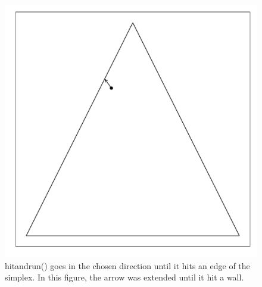 \documentclass{article}\usepackage{graphicx, color}
\makeatletter
\def\maxwidth{ %
  \ifdim\Gin@nat@width>\linewidth
    \linewidth
  \else
    \Gin@nat@width
  \fi
}
\newenvironment{knitrout}{}{} %
\makeatother
\begin{document}
\begin{figure}[H]
\begin{knitrout}
\color{fgcolor}
\includegraphics[width=\maxwidth]{figure/hitandrun_walkthrough3} 

\end{knitrout}

\caption{hitandrun() goes in the chosen direction until it hits an edge of the simplex. In this figure, the arrow was extended until it hit a wall.}
\end{figure}
\end{document}
